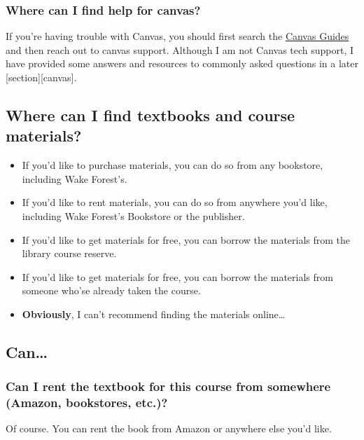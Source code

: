 \documentclass[
]{book}
\providecommand{\tightlist}{%
  \setlength{\itemsep}{0pt}\setlength{\parskip}{0pt}}
\begin{document}
\subsubsection{Where can I find help for canvas?}\label{where-can-i-find-help-for-canvas}

If you're having trouble with Canvas, you should first search the \href{https://community.canvaslms.com/t5/Canvas-Basics-Guide/tkb-p/basics}{Canvas Guides} and then reach out to canvas support. Although I am not Canvas tech support, I have provided some answers and resources to commonly asked questions in a later {[}section{]}{[}canvas{]}.

\subsection{Where can I find textbooks and course materials?}\label{where-can-i-find-textbooks-and-course-materials}

\begin{itemize}
\tightlist
\item
  If you'd like to purchase materials, you can do so from any bookstore, including Wake Forest's.
\item
  If you'd like to rent materials, you can do so from anywhere you'd like, including Wake Forest's Bookstore or the publisher.
\item
  If you'd like to get materials for free, you can borrow the materials from the library course reserve.
\item
  If you'd like to get materials for free, you can borrow the materials from someone who'se already taken the course.
\item
  \textbf{Obviously}, I can't recommend finding the materials online\ldots{}
\end{itemize}

\subsection{Can\ldots{}}\label{can}

\subsubsection{Can I rent the textbook for this course from somewhere (Amazon, bookstores, etc.)?}\label{can-i-rent-the-textbook-for-this-course-from-somewhere-amazon-bookstores-etc.}

Of course. You can rent the book from Amazon or anywhere else you'd like.
\end{document}
